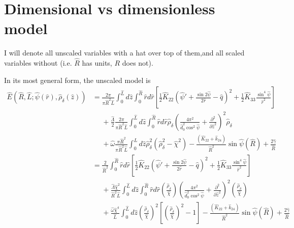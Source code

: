 \documentclass[12pt]{article}
\begin{document}


\section{Dimensional vs dimensionless model}
I will denote all unscaled variables with a hat over top of them,and all scaled variables without (i.e. $\hat{R}$ has units, $R$ does not).

In its most general form, the unscaled model is
\begin{align}\label{eq:generalunits}
\hat{E}(\hat{R},\hat{L};\hat{\psi}(\hat{r}),\hat{\rho}_{\delta}(\hat{z}))&=\frac{2\pi}{\pi\hat{R}^2\hat{L}}\int_0^{\hat{L}}d\hat{z}\int_0^{\hat{R}}\hat{r}d\hat{r}\left[\frac{1}{2}\hat{K}_{22}\left(\hat{\psi}'+\frac{\sin2\hat{\psi}}{2\hat{r}}-\hat{q}\right)^2+\frac{1}{2}\hat{K}_{33}\frac{\sin^4\hat{\psi}}{\hat{r}^2}\right]\nonumber\\
&\phantom{=}+\frac{\hat{\Lambda}}{2}\frac{2\pi}{\pi\hat{R}^2\hat{L}}\int_0^{\hat{L}}d\hat{z}\int_0^{\hat{R}}\hat{r}d\hat{r}\hat{\rho}_{\delta}\left(\frac{4\pi^2}{\hat{d}^2_0\cos^2\hat{\psi}}+\frac{\partial^2}{\partial\hat{z}^2}\right)^2\hat{\rho}_{\delta}\nonumber\\
&\phantom{=}+\hat{\omega}\frac{\pi\hat{R}^2}{\pi\hat{R}^2\hat{L}}\int_0^{\hat{L}}d\hat{z}\hat{\rho}_{\delta}^2\left(\hat{\rho}_{\delta}^2-\hat{\chi}^2\right)-\frac{(\hat{K}_{22}+\hat{k}_{24})}{\hat{R}^2}\sin\hat{\psi}(\hat{R})+\frac{2\hat{\gamma}}{\hat{R}}\nonumber\\
&=\frac{2}{\hat{R}^2}\int_0^{\hat{R}}\hat{r}d\hat{r}\left[\frac{1}{2}\hat{K}_{22}\left(\hat{\psi}'+\frac{\sin2\hat{\psi}}{2\hat{r}}-\hat{q}\right)^2+\frac{1}{2}\hat{K}_{33}\frac{\sin^4\hat{\psi}}{\hat{r}^2}\right]\nonumber\\
&\phantom{=}+\frac{\hat{\Lambda}\hat{\chi}^2}{\hat{R}^2\hat{L}}\int_0^{\hat{L}}d\hat{z}\int_0^{\hat{R}}\hat{r}d\hat{r}\left(\frac{\hat{\rho}_{\delta}}{\hat{\chi}}\right)\left(\frac{4\pi^2}{\hat{d}^2_0\cos^2\hat{\psi}}+\frac{\partial^2}{\partial\hat{z}^2}\right)^2\left(\frac{\hat{\rho}_{\delta}}{\hat{\chi}}\right)\nonumber\\
&\phantom{=}+\frac{\hat{\omega}\hat{\chi}^4}{\hat{L}}\int_0^{\hat{L}}d\hat{z}\left(\frac{\hat{\rho}_{\delta}}{\hat{\chi}}\right)^2\left[\left(\frac{\hat{\rho}_{\delta}}{\hat{\chi}}\right)^2-1\right]-\frac{(\hat{K}_{22}+\hat{k}_{24})}{\hat{R}^2}\sin\hat{\psi}(\hat{R})+\frac{2\hat{\gamma}}{\hat{R}}\nonumber\\
\end{align}
\end{document}
